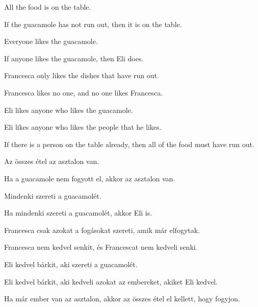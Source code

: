 \begin{earg}
\item All the food is on the table.
\item If the guacamole has not run out, then it is on the table.
\item Everyone likes the guacamole.
\item If anyone likes the guacamole, then Eli does.
\item Francesca only likes the dishes that have run out.
\item Francesca likes no one, and no one likes Francesca.
\item Eli likes anyone who likes the guacamole.
\item Eli likes anyone who likes the people that he likes.
\item If there is a person on the table already, then all of the food must have run out.
\end{earg}

\begin{earg}
\item Az összes étel az asztalon van.
\item Ha a guacamole nem fogyott el, akkor az asztalon van.
\item Mindenki szereti a guacamolét.
\item Ha mindenki szereti a guacamolét, akkor Eli is.
\item Francesca csak azokat a fogásokat szereti, amik már elfogytak.
\item Francesca nem kedvel senkit, és Francescat nem kedveli senki.
\item Eli kedvel bárkit, aki szereti a guacamolét.
\item Eli kedvel bárkit, aki kedveli azokat az embereket, akiket Eli kedvel.
\item Ha már ember van az asztalon, akkor az összes étel el kellett, hogy fogyjon.
\end{earg}


